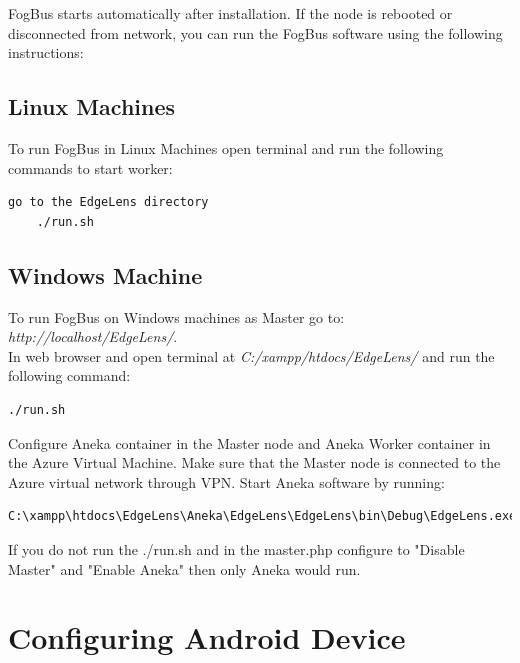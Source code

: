 \documentclass{article}
\begin{document}
FogBus starts automatically after installation. If the node is rebooted or disconnected from network, you can run the FogBus software using the following instructions:

\subsection{Linux Machines}

To run FogBus in Linux Machines open terminal and run the following commands to start worker:

\begin{lstlisting}[style=BashInputStyle]
    go to the EdgeLens directory
    ./run.sh
\end{lstlisting}

\subsection{Windows Machine}

To run FogBus on Windows machines as Master go to: \\ \textit{http://localhost/EdgeLens/}.\\
In web browser and open terminal at \textit{C:/xampp/htdocs/EdgeLens/} and run the following command:
\begin{lstlisting}[style=BashInputStyle]
    ./run.sh
\end{lstlisting}

Configure Aneka container in the Master node and Aneka Worker container in the Azure Virtual Machine. Make sure that the Master node is connected to the Azure virtual network through VPN. Start Aneka software by running:
\begin{lstlisting}[style=BashInputStyle]
    C:\xampp\htdocs\EdgeLens\Aneka\EdgeLens\EdgeLens\bin\Debug\EdgeLens.exe
\end{lstlisting}

If you do not run the ./run.sh and in the master.php configure to "Disable Master" and "Enable Aneka" then only Aneka would run. 

\newpage

\section{Configuring Android Device}
\end{document}
